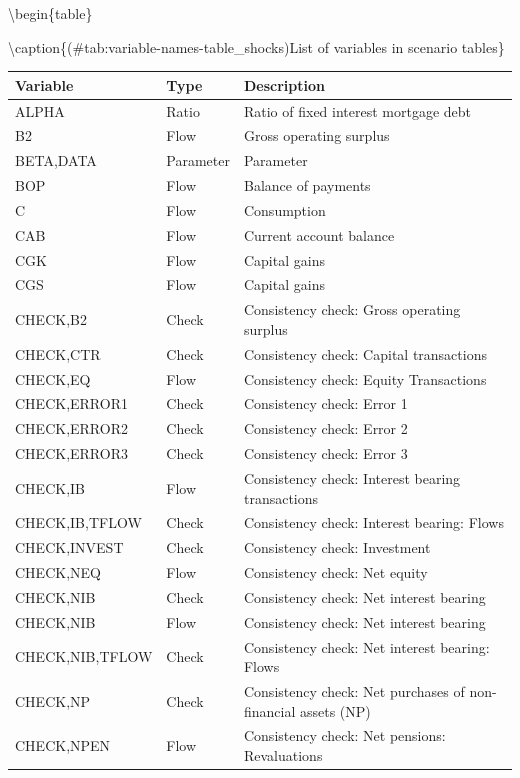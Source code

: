 \documentclass[
]{book}
\begin{document}
\textbackslash begin\{table\}

\textbackslash caption\{(\#tab:variable-names-table\_shocks)List of variables in scenario tables\}
\centering
\fontsize{10}{12}\selectfont

\begin{tabular}[t]{l|l|l}
\hline
Variable & Type & Description\\
\hline
ALPHA & Ratio & Ratio of fixed interest mortgage debt\\
\hline
B2 & Flow & Gross operating surplus\\
\hline
BETA,DATA & Parameter & Parameter\\
\hline
BOP & Flow & Balance of payments\\
\hline
C & Flow & Consumption\\
\hline
CAB & Flow & Current account balance\\
\hline
CGK & Flow & Capital gains\\
\hline
CGS & Flow & Capital gains\\
\hline
CHECK,B2 & Check & Consistency check: Gross operating surplus\\
\hline
CHECK,CTR & Check & Consistency check: Capital transactions\\
\hline
CHECK,EQ & Flow & Consistency check: Equity Transactions\\
\hline
CHECK,ERROR1 & Check & Consistency check: Error 1\\
\hline
CHECK,ERROR2 & Check & Consistency check: Error 2\\
\hline
CHECK,ERROR3 & Check & Consistency check: Error 3\\
\hline
CHECK,IB & Flow & Consistency check: Interest bearing transactions\\
\hline
CHECK,IB,TFLOW & Check & Consistency check: Interest bearing: Flows\\
\hline
CHECK,INVEST & Check & Consistency check: Investment\\
\hline
CHECK,NEQ & Flow & Consistency check: Net equity\\
\hline
CHECK,NIB & Check & Consistency check: Net interest bearing\\
\hline
CHECK,NIB & Flow & Consistency check: Net interest bearing\\
\hline
CHECK,NIB,TFLOW & Check & Consistency check: Net interest bearing: Flows\\
\hline
CHECK,NP & Check & Consistency check: Net purchases of non-financial assets (NP)\\
\hline
CHECK,NPEN & Flow & Consistency check: Net pensions: Revaluations\\

\end{tabular}
\end{document}
